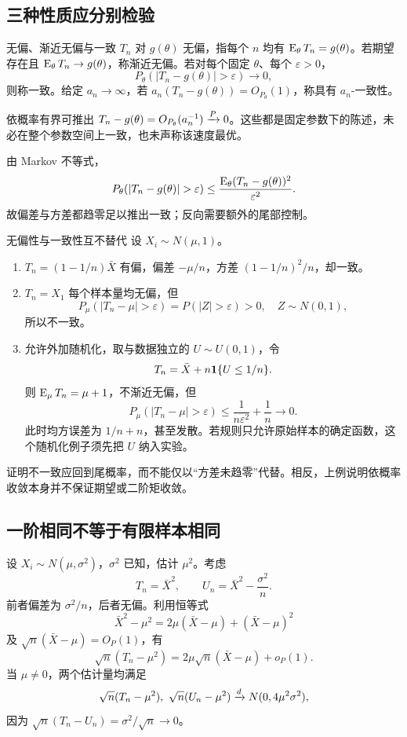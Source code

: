 \subsection{三种性质应分别检验}
\begin{definitionbox}{无偏、渐近无偏与一致}
$T_n$ 对 $g(\theta)$ 无偏，指每个 $n$ 均有 $\operatorname{E}_\theta T_n=g(\theta)$。若期望存在且 $\operatorname{E}_\theta T_n\to g(\theta)$，称渐近无偏。若对每个固定 $\theta$、每个 $\varepsilon>0$，
\[
 P_\theta(|T_n-g(\theta)|>\varepsilon)\to0,
\]
则称一致。给定 $a_n\to\infty$，若 $a_n(T_n-g(\theta))=O_{P_\theta}(1)$，称具有 $a_n$-一致性。
\end{definitionbox}

依概率有界可推出 $T_n-g(\theta)=O_{P_\theta}(a_n^{-1})\xrightarrow{P}0$。这些都是固定参数下的陈述，未必在整个参数空间上一致，也未声称该速度最优。

由 Markov 不等式，
\[
 P_\theta(|T_n-g(\theta)|>\varepsilon)
 \le\frac{\E_\theta(T_n-g(\theta))^2}{\varepsilon^2}.
\]
故偏差与方差都趋零足以推出一致；反向需要额外的尾部控制。

\begin{examplebox}{无偏性与一致性互不替代}
设 $X_i\sim N(\mu,1)$。
\begin{enumerate}
 \item $T_n=(1-1/n)\bar X$ 有偏，偏差 $-\mu/n$，方差 $(1-1/n)^2/n$，却一致。
 \item $T_n=X_1$ 每个样本量均无偏，但
 \[
 P_\mu(|T_n-\mu|>\varepsilon)=P(|Z|>\varepsilon)>0,
 \quad Z\sim N(0,1),
 \]
 所以不一致。
 \item 允许外加随机化，取与数据独立的 $U\sim U(0,1)$，令
 \[
 T_n=\bar X+n\mathbf 1\{U\le1/n\}.
 \]
 则 $\operatorname{E}_\mu T_n=\mu+1$，不渐近无偏，但
 \[
 P_\mu(|T_n-\mu|>\varepsilon)
 \le \frac1{n\varepsilon^2}+\frac1n\to0.
 \]
 此时均方误差为 $1/n+n$，甚至发散。若规则只允许原始样本的确定函数，这个随机化例子须先把 $U$ 纳入实验。
\end{enumerate}
\end{examplebox}

证明不一致应回到尾概率，而不能仅以“方差未趋零”代替。相反，上例说明依概率收敛本身并不保证期望或二阶矩收敛。

\subsection{一阶相同不等于有限样本相同}
设 $X_i\sim N(\mu,\sigma^2)$，$\sigma^2$ 已知，估计 $\mu^2$。考虑
\[
 T_n=\bar X^2,\qquad U_n=\bar X^2-\frac{\sigma^2}{n}.
\]
前者偏差为 $\sigma^2/n$，后者无偏。利用恒等式
\[
 \bar X^2-\mu^2=2\mu(\bar X-\mu)+(\bar X-\mu)^2
\]
及 $\sqrt n(\bar X-\mu)=O_P(1)$，有
\[
 \sqrt n(T_n-\mu^2)
 =2\mu\sqrt n(\bar X-\mu)+o_P(1).
\]
当 $\mu\ne0$，两个估计量均满足
\[
 \sqrt n(T_n-\mu^2),\ \sqrt n(U_n-\mu^2)
 \xrightarrow{d} N(0,4\mu^2\sigma^2),
\]
因为 $\sqrt n(T_n-U_n)=\sigma^2/\sqrt n\to0$。

